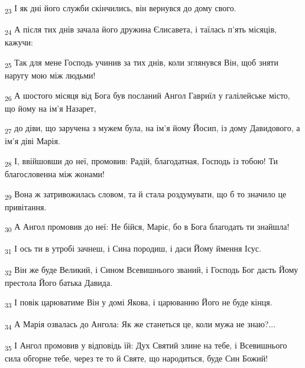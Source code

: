 \begin{tcolorbox}
\textsubscript{23} І як дні його служби скінчились, він вернувся до дому свого.
\end{tcolorbox}
\begin{tcolorbox}
\textsubscript{24} А після тих днів зачала його дружина Єлисавета, і таїлась п'ять місяців, кажучи:
\end{tcolorbox}
\begin{tcolorbox}
\textsubscript{25} Так для мене Господь учинив за тих днів, коли зглянувся Він, щоб зняти наругу мою між людьми!
\end{tcolorbox}
\begin{tcolorbox}
\textsubscript{26} А шостого місяця від Бога був посланий Ангол Гавриїл у галілейське місто, що йому на ім'я Назарет,
\end{tcolorbox}
\begin{tcolorbox}
\textsubscript{27} до діви, що заручена з мужем була, на ім'я йому Йосип, із дому Давидового, а ім'я діві Марія.
\end{tcolorbox}
\begin{tcolorbox}
\textsubscript{28} І, ввійшовши до неї, промовив: Радій, благодатная, Господь із тобою! Ти благословенна між жонами!
\end{tcolorbox}
\begin{tcolorbox}
\textsubscript{29} Вона ж затривожилась словом, та й стала роздумувати, що б то значило це привітання.
\end{tcolorbox}
\begin{tcolorbox}
\textsubscript{30} А Ангол промовив до неї: Не бійся, Маріє, бо в Бога благодать ти знайшла!
\end{tcolorbox}
\begin{tcolorbox}
\textsubscript{31} І ось ти в утробі зачнеш, і Сина породиш, і даси Йому ймення Ісус.
\end{tcolorbox}
\begin{tcolorbox}
\textsubscript{32} Він же буде Великий, і Сином Всевишнього званий, і Господь Бог дасть Йому престола Його батька Давида.
\end{tcolorbox}
\begin{tcolorbox}
\textsubscript{33} І повік царюватиме Він у домі Якова, і царюванню Його не буде кінця.
\end{tcolorbox}
\begin{tcolorbox}
\textsubscript{34} А Марія озвалась до Ангола: Як же станеться це, коли мужа не знаю?...
\end{tcolorbox}
\begin{tcolorbox}
\textsubscript{35} І Ангол промовив у відповідь їй: Дух Святий злине на тебе, і Всевишнього сила обгорне тебе, через те то й Святе, що народиться, буде Син Божий!
\end{tcolorbox}
